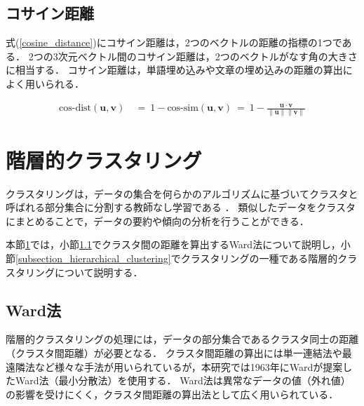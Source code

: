 \documentclass[12pt,a4j,dvipdfmx]{jreport}
\begin{document}
\subsection{コサイン距離}
\label{subsection_cosine_distance}
式(\ref{cosine_distance})にコサイン距離は，2つのベクトルの距離の指標の1つである．
2つの3次元ベクトル間のコサイン距離は，2つのベクトルがなす角の大きさに相当する．
コサイン距離は，単語埋め込みや文章の埋め込みの距離の算出によく用いられる．

\begin{align}
  \text{cos-dist}\left(\bm{u}, \bm{v}\right) ~&=~
  1 -
  \text{cos-sim}\left(\bm{u}, \bm{v}\right) ~=~
  1 - \frac{\bm{u} \cdot \bm{v}}{\|\bm{u}\|\|\bm{v}\|}
  \label{cosine_distance}
\end{align}

\section{階層的クラスタリング}
\label{section_clustering}
クラスタリングは，データの集合を何らかのアルゴリズムに基づいてクラスタと呼ばれる部分集合に分割する教師なし学習である
．
類似したデータをクラスタにまとめることで，データの要約や傾向の分析を行うことができる．

本節\ref{section_clustering}では，小節\ref{subsection_wards_method}でクラスタ間の距離を算出するWard法について説明し，小節\ref{subsection_hierarchical_clustering}でクラスタリングの一種である階層的クラスタリングについて説明する．



\subsection{Ward法}
\label{subsection_wards_method}
階層的クラスタリングの処理には，データの部分集合であるクラスタ同士の距離（クラスタ間距離）が必要となる．
クラスタ間距離の算出には単一連結法や最遠隣法など様々な手法が用いられているが，本研究では1963年にWardが提案したWard法（最小分散法）を使用する\cite{murtagh_wards_2014}．
Ward法は異常なデータの値（外れ値）の影響を受けにくく，クラスタ間距離の算出法として広く用いられている．
\end{document}
